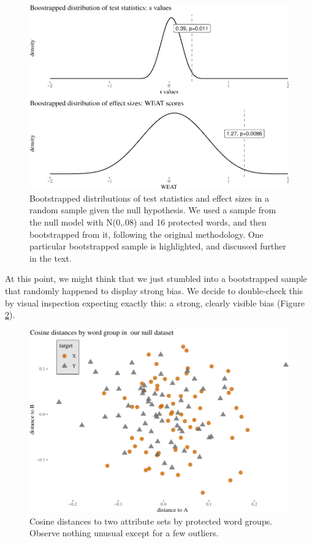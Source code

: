\documentclass{clv3}
\begin{document}
\begin{figure}

\begin{center}\includegraphics[width=0.8\linewidth]{figures/figcaliskanCalcB2D} \end{center}

\caption{Bootstrapped distributions of test statistics and effect sizes in a random sample given the null hypothesis. We used a sample from the null  model with N(0,.08) and 16 protected words, and then bootstrapped from it, following the original methodology. One particular bootstrapped sample is highlighted, and discussed further in the text. }
\label{fig:caliskanCalc}
\end{figure}

At this point, we might think that we just stumbled into a bootstrapped
sample that randomly happened to display strong bias. We decide to
double-check this by visual inspection expecting exactly this: a strong,
clearly visible bias (Figure \ref{fig:caliskanDistances}).

\begin{figure}

\begin{center}\includegraphics[width=0.8\linewidth]{figures/figcaliskanDistC2K} \end{center}

\caption{Cosine distances to two attribute sets by protected word groups. Observe nothing unusual except for a few outliers.}
\label{fig:caliskanDistances}
\end{figure}
\end{document}
